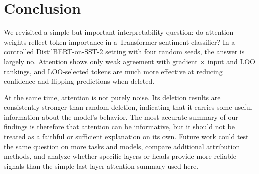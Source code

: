 \section{Conclusion}
\label{sec:conclusion}

We revisited a simple but important interpretability question: do attention weights reflect token importance in a Transformer sentiment classifier? In a controlled DistilBERT-on-SST-2 setting with four random seeds, the answer is largely no. Attention shows only weak agreement with gradient $\times$ input and LOO rankings, and LOO-selected tokens are much more effective at reducing confidence and flipping predictions when deleted.

At the same time, attention is not purely noise. Its deletion results are consistently stronger than random deletion, indicating that it carries some useful information about the model's behavior. The most accurate summary of our findings is therefore that attention can be informative, but it should not be treated as a faithful or sufficient explanation on its own. Future work could test the same question on more tasks and models, compare additional attribution methods, and analyze whether specific layers or heads provide more reliable signals than the simple last-layer attention summary used here.
